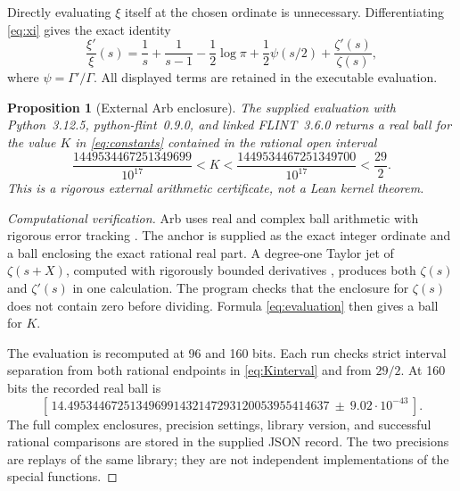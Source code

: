 \documentclass[11pt,a4paper]{article}
\newtheorem{proposition}[theorem]{Proposition}
\theoremstyle{definition}
\begin{document}
Directly evaluating $\xi$ itself at the chosen ordinate is
unnecessary. Differentiating \eqref{eq:xi} gives the exact identity
\begin{equation}\label{eq:evaluation}
 \frac{\xi'}{\xi}(s)
 =\frac1s+\frac1{s-1}-\frac12\log\pi
  +\frac12\psi(s/2)+\frac{\zeta'(s)}{\zeta(s)},
\end{equation}
where $\psi=\Gamma'/\Gamma$. All displayed terms are retained in
the executable evaluation.

\begin{proposition}[External Arb enclosure]\label{prop:arb}
The supplied evaluation with Python~3.12.5, python-flint~0.9.0,
and linked FLINT~3.6.0
returns a real ball for the value $K$ in \eqref{eq:constants}
contained in the rational open interval
\begin{equation}\label{eq:Kinterval}
 \frac{1449534467251349699}{10^{17}}
 < K <
 \frac{1449534467251349700}{10^{17}}<\frac{29}{2}.
\end{equation}
This is a rigorous external arithmetic certificate, not a Lean
kernel theorem.
\end{proposition}

\begin{proof}[Computational verification]
Arb uses real and complex ball arithmetic with rigorous error
tracking \cite{JohanssonArb,PythonFlint}. The anchor is supplied
as the exact integer ordinate and a ball enclosing the exact
rational real part. A degree-one Taylor jet of $\zeta(s+X)$,
computed with rigorously bounded derivatives \cite{JohanssonZeta},
produces both $\zeta(s)$ and $\zeta'(s)$ in one calculation.
The program checks that the enclosure for $\zeta(s)$ does not
contain zero before dividing. Formula \eqref{eq:evaluation}
then gives a ball for $K$.

The evaluation is recomputed at 96 and 160 bits. Each run checks
strict interval separation from both rational endpoints in
\eqref{eq:Kinterval} and from $29/2$. At 160 bits the recorded
real ball is
\[
 \left[\,14.495344672513496991432147293120053955414637
          \ \pm\ 9.02\cdot10^{-43}\,\right].
\]
The full complex enclosures, precision settings, library version,
and successful rational comparisons are stored in the supplied
JSON record. The two precisions are replays of the same library;
they are not independent implementations of the special functions.
\end{proof}
\end{document}
